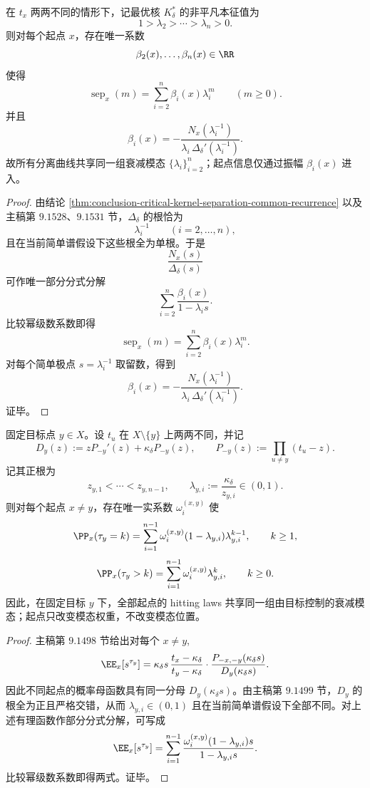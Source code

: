 \begin{theorem}[分离距离的共同几何模态分解]\label{thm:conclusion-critical-kernel-separation-common-geometric-modes}
在 \(t_x\) 两两不同的情形下，记最优核 \(K_\delta^\ast\) 的非平凡本征值为
\[
1>\lambda_2>\cdots>\lambda_n>0.
\]
则对每个起点 \(x\)，存在唯一系数
\[
\beta_2(x),\dots,\beta_n(x)\in \RR
\]
使得
\[
\operatorname{sep}_x(m)=\sum_{i=2}^n \beta_i(x)\lambda_i^m
\qquad(m\ge 0).
\]
并且
\[
\beta_i(x)= -\frac{N_x(\lambda_i^{-1})}{\lambda_i\,\Delta_\delta'(\lambda_i^{-1})}.
\]
故所有分离曲线共享同一组衰减模态 \(\{\lambda_i\}_{i=2}^n\)；起点信息仅通过振幅 \(\beta_i(x)\) 进入。
\end{theorem}
\begin{proof}
由结论 \ref{thm:conclusion-critical-kernel-separation-common-recurrence} 以及主稿第 \(9.1528\)、\(9.1531\) 节，\(\Delta_\delta\) 的根恰为
\[
\lambda_i^{-1}\qquad(i=2,\dots,n),
\]
且在当前简单谱假设下这些根全为单根。于是
\[
\frac{N_x(s)}{\Delta_\delta(s)}
\]
可作唯一部分分式分解
\[
\sum_{i=2}^n \frac{\beta_i(x)}{1-\lambda_i s}.
\]
比较幂级数系数即得
\[
\operatorname{sep}_x(m)=\sum_{i=2}^n \beta_i(x)\lambda_i^m.
\]
对每个简单极点 \(s=\lambda_i^{-1}\) 取留数，得到
\[
\beta_i(x)= -\frac{N_x(\lambda_i^{-1})}{\lambda_i\,\Delta_\delta'(\lambda_i^{-1})}.
\]
证毕。
\end{proof}

\begin{theorem}\label{thm:conclusion-critical-kernel-fixed-target-hitting-spectrum}
固定目标点 \(y\in X\)。设 \(t_u\) 在 \(X\setminus\{y\}\) 上两两不同，并记
\[
D_y(z):=zP_{-y}'(z)+\kappa_\delta P_{-y}(z),
\qquad
P_{-y}(z):=\prod_{u\ne y}(t_u-z).
\]
记其正根为
\[
z_{y,1}<\cdots<z_{y,n-1},
\qquad
\lambda_{y,i}:=\frac{\kappa_\delta}{z_{y,i}}\in(0,1).
\]
则对每个起点 \(x\ne y\)，存在唯一实系数 \(\omega_i^{(x,y)}\) 使
\[
\PP_x(\tau_y=k)
=
\sum_{i=1}^{n-1}\omega_i^{(x,y)}(1-\lambda_{y,i})\lambda_{y,i}^{k-1},
\qquad k\ge 1,
\]
\[
\PP_x(\tau_y>k)
=
\sum_{i=1}^{n-1}\omega_i^{(x,y)}\lambda_{y,i}^{k},
\qquad k\ge 0.
\]
因此，在固定目标 \(y\) 下，全部起点的 hitting laws 共享同一组由目标控制的衰减模态；起点只改变模态权重，不改变模态位置。
\end{theorem}
\begin{proof}
主稿第 \(9.1498\) 节给出对每个 \(x\ne y\),
\[
\EE_x[s^{\tau_y}]
=
\kappa_\delta s\,\frac{t_x-\kappa_\delta}{t_y-\kappa_\delta}
\cdot
\frac{P_{-x,-y}(\kappa_\delta s)}{D_y(\kappa_\delta s)}.
\]
因此不同起点的概率母函数具有同一分母 \(D_y(\kappa_\delta s)\)。由主稿第 \(9.1499\) 节，\(D_y\) 的根全为正且严格交错，从而 \(\lambda_{y,i}\in(0,1)\) 且在当前简单谱假设下全部不同。对上述有理函数作部分分式分解，可写成
\[
\EE_x[s^{\tau_y}]
=
\sum_{i=1}^{n-1}\frac{\omega_i^{(x,y)}(1-\lambda_{y,i})s}{1-\lambda_{y,i}s}.
\]
比较幂级数系数即得两式。证毕。
\end{proof}


